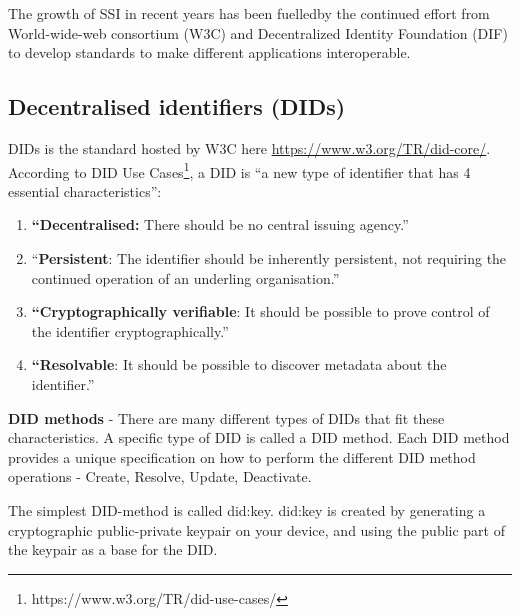 The growth of SSI in recent years has been fuelledby the continued effort from World-wide-web consortium (W3C) and Decentralized Identity Foundation (DIF) to develop standards to make different applications interoperable.

\hypertarget{decentralised-identifiers-dids}{%
\subsection{Decentralised identifiers
(DIDs)}\label{decentralised-identifiers-dids}}

DIDs is the standard hosted by W3C here \url{https://www.w3.org/TR/did-core/}. According to DID Use Cases\footnote{https://www.w3.org/TR/did-use-cases/}, a DID is ``a new type of identifier that has 4 essential characteristics'':

\begin{enumerate}
\def\labelenumi{\arabic{enumi}.}
\tightlist
\item
  \textbf{``Decentralised:} There should be no central issuing agency.''
\item
  ``\textbf{Persistent}: The identifier should be inherently persistent,
  not requiring the continued operation of an underling organisation.''
\item
  \textbf{``Cryptographically verifiable}: It should be possible to prove
  control of the identifier cryptographically.''
\item
  \textbf{``Resolvable}: It should be possible to discover metadata about
  the identifier.''
\end{enumerate}



\pagebreak





\textbf{DID methods} - There are many different types of DIDs that fit these characteristics. A
specific type of DID is called a DID method. Each DID method provides a
unique specification on how to perform the different
DID method operations - Create, Resolve, Update, Deactivate.

The simplest DID-method is called did:key. did:key is created by
generating a cryptographic public-private keypair on your device, and
using the public part of the keypair as a base for the DID.

